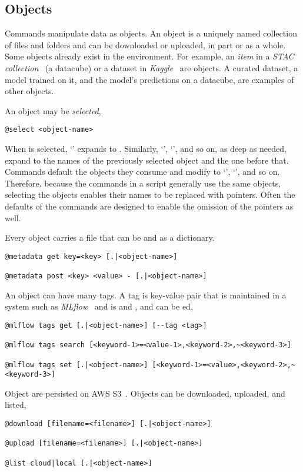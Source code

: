 \subsection{Objects}

Commands manipulate data as objects. An object is a uniquely named collection of files and folders and can be downloaded or uploaded, in part or as a whole. Some objects already exist in the environment. For example, an \emph{item} in a \emph{STAC collection}~\cite{stac_intro_tutorial} (a datacube) or a dataset in \emph{Kaggle}~\cite{chen2019-AIRD-dataset} are objects. A curated dataset, a model trained on it, and the model's predictions on a datacube, are examples of other objects.

An object may be \emph{selected},
%
\begin{verbatim}
@select <object-name>
\end{verbatim}
%
When  is selected,  `' expands to . Similarly, `', `', and so on, as deep as needed, expand to the names of the previously selected object and the one before that. Commands default the objects they consume and modify to `', `', and so on. Therefore, because the commands in a script generally use the same objects, selecting the objects enables their names to be replaced with pointers. Often the defaults of the commands are designed to enable the omission of the pointers as well.

Every object carries a  file that can be  and  as a dictionary.
%
\begin{verbatim}
@metadata get key=<key> [.|<object-name>]

@metadata post <key> <value> - [.|<object-name>]
\end{verbatim}

An object can have many tags. A tag is key-value pair that is maintained in a system such as \emph{MLflow}~\cite{mlflow} and is  and , and can be ed,
%
\begin{verbatim}
@mlflow tags get [.|<object-name>] [--tag <tag>]

@mlflow tags search [<keyword-1>=<value-1>,<keyword-2>,~<keyword-3>]

@mlflow tags set [.|<object-name>] [<keyword-1>=<value>,<keyword-2>,~<keyword-3>]
\end{verbatim}

Object are persisted on AWS S3~\cite{aws_s3}. Objects can be downloaded, uploaded, and listed,
%
\begin{verbatim}
@download [filename=<filename>] [.|<object-name>]

@upload [filename=<filename>] [.|<object-name>]
    
@list cloud|local [.|<object-name>]
\end{verbatim}